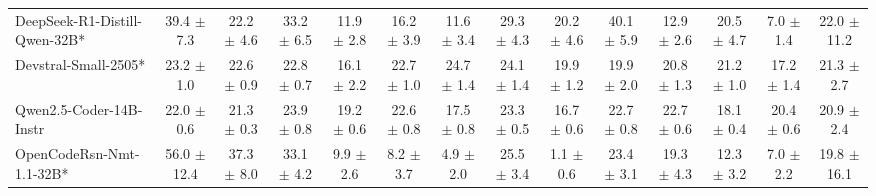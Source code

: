 \documentclass{llmxive}
\begin{document}
\begin{table}[t]
{\begin{tabular}{l *{13}{c}}
\rowcolor{gray!10}
 DeepSeek-R1-Distill-Qwen-32B* &
39.4 {\tiny$\pm$ 7.3} & 
22.2 {\tiny$\pm$ 4.6} & 
33.2 {\tiny$\pm$ 6.5} & 
11.9 {\tiny$\pm$ 2.8} &
16.2 {\tiny$\pm$ 3.9} & 
11.6 {\tiny$\pm$ 3.4} & 
29.3 {\tiny$\pm$ 4.3} & 
20.2 {\tiny$\pm$ 4.6} &
40.1 {\tiny$\pm$ 5.9} & 
12.9 {\tiny$\pm$ 2.6} & 
20.5 {\tiny$\pm$ 4.7} & 
7.0 {\tiny$\pm$ 1.4} &
22.0 {\tiny$\pm$ 11.2} \\



 Devstral-Small-2505* &
23.2 {\tiny$\pm$ 1.0} & 
22.6 {\tiny$\pm$ 0.9} & 
22.8 {\tiny$\pm$ 0.7} & 
16.1 {\tiny$\pm$ 2.2} &
22.7 {\tiny$\pm$ 1.0} & 
24.7 {\tiny$\pm$ 1.4} & 
24.1 {\tiny$\pm$ 1.4} & 
19.9 {\tiny$\pm$ 1.2} &
19.9 {\tiny$\pm$ 2.0} & 
20.8 {\tiny$\pm$ 1.3} & 
21.2 {\tiny$\pm$ 1.0} & 
17.2 {\tiny$\pm$ 1.4} &
21.3 {\tiny$\pm$ 2.7} \\


\rowcolor{gray!10}
Qwen2.5-Coder-14B-Instr 
 & 22.0 {\tiny$\pm$ 0.6} & 
 21.3 {\tiny$\pm$ 0.3} & 
 23.9 {\tiny$\pm$ 0.8} & 
 19.2 {\tiny$\pm$ 0.6} & 
 22.6 {\tiny$\pm$ 0.8} & 
 17.5 {\tiny$\pm$ 0.8} & 
 23.3 {\tiny$\pm$ 0.5} & 
 16.7 {\tiny$\pm$ 0.6} & 
 22.7 {\tiny$\pm$ 0.8} & 
 22.7 {\tiny$\pm$ 0.6} & 
 18.1 {\tiny$\pm$ 0.4} & 
 20.4 {\tiny$\pm$ 0.6} & 
 20.9 {\tiny$\pm$ 2.4} \\


 OpenCodeRsn-Nmt-1.1-32B* &
56.0 {\tiny$\pm$ 12.4} & 
37.3 {\tiny$\pm$ 8.0} & 
33.1 {\tiny$\pm$ 4.2} & 
9.9 {\tiny$\pm$ 2.6} &
8.2 {\tiny$\pm$ 3.7} & 
4.9 {\tiny$\pm$ 2.0} & 
25.5 {\tiny$\pm$ 3.4} & 
1.1 {\tiny$\pm$ 0.6} &
23.4 {\tiny$\pm$ 3.1} & 
19.3 {\tiny$\pm$ 4.3} & 
12.3 {\tiny$\pm$ 3.2} & 
7.0 {\tiny$\pm$ 2.2} &
19.8 {\tiny$\pm$ 16.1} \\



\end{tabular}}
\end{table}
\end{document}
